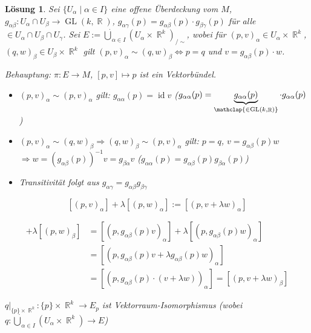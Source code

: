 \documentclass[paper=A4, twoside, chapterprefix=true, bibliography=totoc, headsepline]{scrbook}
\DeclareMathOperator{\R}{\mathbb{R}}
\DeclareMathOperator{\GL}{GL}       %
\DeclareMathOperator{\Id}{id}       %
\newcommand{\X}{\times}
\theoremstyle{plain}
\theoremstyle{nonumberplain}
\theoremstyle{empty}
\theoremstyle{break}
\newtheorem{Loes}{L\"osung}
\newcommand{\quot}[1]{\textrm{\glqq}{#1}\textrm{\grqq}}
\begin{document}
\begin{Loes}
Sei $\{U_\alpha \mid \alpha \in I\}$ eine offene \"Uberdeckung vom $M$, $g_{\alpha\beta}: U_\alpha \cap U_\beta \to \GL(k,\R)$, $g_{\alpha\gamma}(p) = g_{\alpha\beta}(p) \cdot g_{\beta\gamma}(p)$ f\"ur alle $ \in U_\alpha \cap U_\beta \cap U_\gamma$. Sei $E := \dot\bigcup_{\alpha \in I} (U_\alpha \X \R^k)_{/\sim}$, wobei f\"ur $(p,v)_\alpha \in U_\alpha \X \R^k$, $(q,w)_\beta \in U_\beta \X \R^k$ gilt $(p,v)_\alpha \sim (q,w)_\beta \Leftrightarrow p=q$ und $v = g_{\alpha\beta}(p) \cdot w$.

\emph{Behauptung:} $\pi: E \to M$, $[p,v] \mapsto p$ ist ein Vektorb\"undel.

\begin{description}[leftmargin=*]
\item[\quot{$\bm{\sim}$} ist \"Aquivalenzrelation:]\begin{itemize}[leftmargin=*]
	\item
		$(p,v)_\alpha \sim (p,v)_\alpha$ gilt: $g_{\alpha\alpha}(p) = \Id v$ ($g_{\alpha\alpha}(p) = \underbrace{g_{\alpha\alpha}(p)}_{\mathclap{\in \GL(k,\R)}} \cdot g_{\alpha\alpha}(p)$)
	\item
		$(p,v)_\alpha \sim (q,w)_\beta \Rightarrow (q,w)_\beta \sim (p,v)_\alpha$ gilt: $p=q$, $v=g_{\alpha\beta}(p)w$ $\Rightarrow w = (g_{\alpha\beta}(p))^{-1} v = g_{\beta\alpha} v$ ($g_{\alpha\alpha}(p) = g_{\alpha\beta}(p) g_{\beta\alpha}(p)$)
	\item
		Transitivit\"at folgt aus $g_{\alpha\gamma} = g_{\alpha\beta} g_{\beta\gamma}$
	\end{itemize}
\item[$\bm{E_p}$ ist $\bm{k}$-dimensionaler Vektorraum:]
	\[ [(p,v)_\alpha] + \lambda[(p,w)_\alpha] := [(p, v + \lambda w)_\alpha] \]
	\begin{description}[font=\normalfont\itshape,leftmargin=*]
	\item[unabh\"angig von $\alpha$:]
		\begin{align*}
			[(p,v)_\beta] + \lambda[(p,w)_\beta] &= [(p,g_{\alpha\beta}(p)v)_\alpha] + \lambda[(p,g_{\alpha\beta}(p)w)_\alpha] \\
				&= [(p,g_{\alpha\beta}(p)v + \lambda g_{\alpha\beta}(p)w)_\alpha] \\
				&= [(p,g_{\alpha\beta}(p) \cdot(v + \lambda w))_\alpha] = [(p,v + \lambda w)_\beta]
		\end{align*}
	\item[$k$-dimensional:]
		$q|_{\{p\} \X \R^k} : \{p\} \X \R^k \to E_p$ ist Vektorraum-Isomorphismus (wobei $q: \dot \bigcup_{\alpha \in I} (U_\alpha \X \R^k) \to E$)

\end{description}
\end{description}
\end{Loes}
\end{document}
